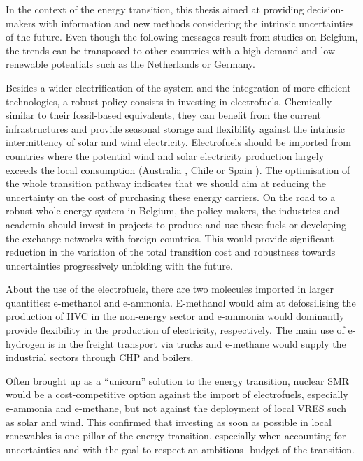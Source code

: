In the context of the energy transition, this thesis aimed at providing decision-makers with information and new methods considering the intrinsic uncertainties of the future. Even though the following messages result from studies on Belgium, the trends can be transposed to other countries with a high demand and low renewable potentials such as the Netherlands or Germany. 

Besides a wider electrification of the system and the integration of more efficient technologies, a robust policy consists in investing in electrofuels. Chemically similar to their fossil-based equivalents, they can benefit from the current infrastructures and provide seasonal storage and flexibility against the intrinsic intermittency of solar and wind electricity. Electrofuels should be imported from countries where the potential wind and solar electricity production largely exceeds the local consumption (Australia \cite{Australia_efuels}, Chile \cite{Chile_efuels} or Spain \cite{Spain_efuels}). The optimisation of the whole transition pathway indicates that we should aim at reducing the uncertainty on the cost of purchasing these energy carriers. On the road to a robust whole-energy system in Belgium, the policy makers, the industries and academia should invest in projects to produce and use these fuels or developing the exchange networks with foreign countries. This would provide significant reduction in the variation of the total transition cost and robustness towards uncertainties progressively unfolding with the future. 

About the use of the electrofuels, there are two molecules imported in larger quantities: e-methanol and e-ammonia. E-methanol would aim at defossilising the production of \acrfull{HVC} in the non-energy sector and e-ammonia would dominantly provide flexibility in the production of electricity, respectively. The main use of e-hydrogen is in the freight transport via trucks and e-methane would supply the industrial sectors through \gls{CHP} and boilers.

Often brought up as a ``unicorn'' solution to the energy transition, nuclear \gls{SMR} would be a cost-competitive option against the import of electrofuels, especially e-ammonia and e-methane, but not against the deployment of local \acrfull{VRES} such as solar and wind. This confirmed that investing as soon as possible in local renewables is one pillar of the energy transition, especially when accounting for uncertainties and with the goal to respect an ambitious -budget of the transition. 


